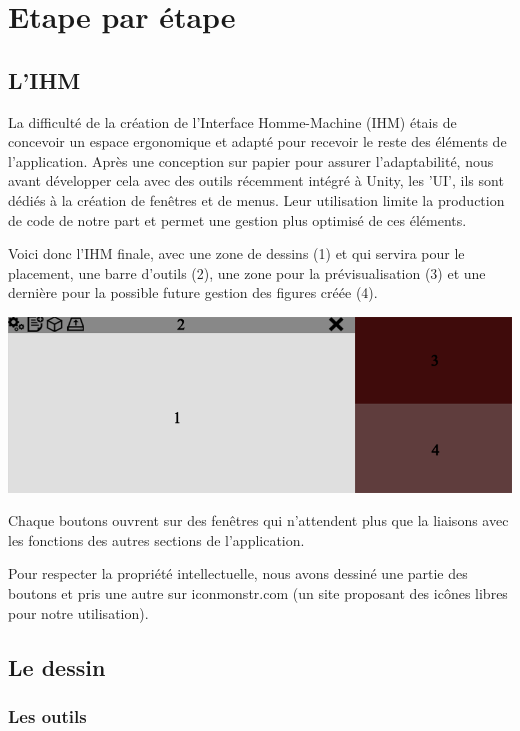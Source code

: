\documentclass[a4paper,11pt]{article}
\begin{document}
	\section{Etape par étape}
		\subsection{L'IHM}
			La difficulté de la création de l'Interface Homme-Machine (IHM) étais de concevoir un espace ergonomique et adapté pour recevoir le reste des éléments de l'application. Après une conception sur papier pour assurer l'adaptabilité, nous avant développer cela avec des outils récemment intégré à Unity, les 'UI', ils sont dédiés à la création de fenêtres et de menus. Leur utilisation limite la production de code de notre part et permet une gestion plus optimisé de ces éléments.
			
			Voici donc l'IHM finale, avec une zone de dessins (1) et qui servira pour le placement, une barre d'outils (2), une zone pour la prévisualisation (3) et une dernière pour la possible future gestion des figures créée (4).
			
			\centerline{\includegraphics[scale=0.5]{images/ihm.png}}

			Chaque boutons ouvrent sur des fenêtres qui n'attendent plus que la liaisons avec les fonctions des autres sections de l'application.
			
			Pour respecter la propriété intellectuelle, nous avons dessiné une partie des boutons et pris une autre sur iconmonstr.com (un site proposant des icônes libres pour notre utilisation).
		\subsection{Le dessin}
		
			\subsubsection{Les outils}	
						
\end{document}
